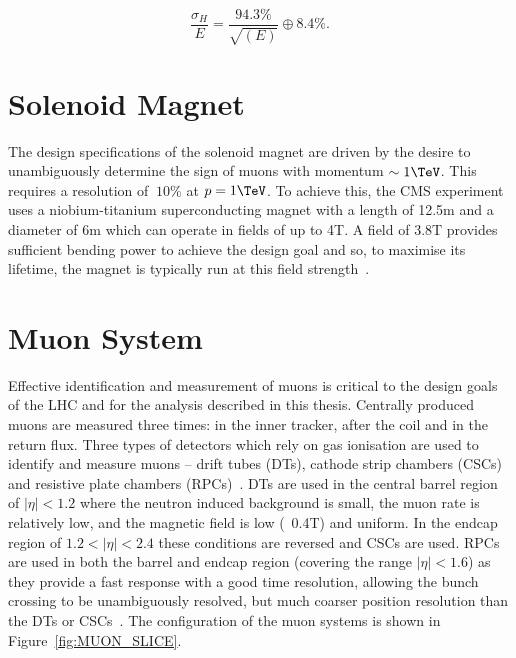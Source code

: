 \begin{equation}
\frac{\sigma_H}{E} = \frac{94.3\%}{\sqrt{(E)}} \oplus 8.4\%.
\label{equ:energy-resolution-hcal}
\end{equation}

\section{Solenoid Magnet}

The design specifications of the solenoid magnet are driven by the desire to unambiguously determine
the sign of muons with momentum $\sim 1\TeV$. This requires a resolution of $~10\%$ at $p=1\TeV$.
To achieve this, the CMS experiment uses a niobium-titanium superconducting magnet with a length of
12.5m and a diameter of 6m which can operate in fields of up to 4T. A field of 3.8T provides
sufficient bending power to achieve the design goal and so, to maximise its lifetime, the magnet is
typically run at this field strength~\cite{CMS}.

\section{Muon System}

Effective identification and measurement of muons is critical to the design goals of the LHC and
for the analysis described in this thesis. Centrally produced muons are measured three times:
in the inner tracker, after the coil and in the return flux. Three types of detectors which rely on gas ionisation are 
used to identify and measure muons -- drift tubes (DTs), cathode strip chambers (CSCs) and resistive
plate chambers (RPCs)~\cite{CMS}. DTs are used in the central barrel region of $|\eta| < 1.2$ where 
the neutron induced background is small, the muon rate is relatively low, 
and the magnetic field is low (~0.4T) and uniform. In the endcap region of $ 1.2 < |\eta| < 2.4$ these conditions are 
reversed and CSCs are used. RPCs are used in both the barrel and endcap region (covering the range $|\eta| < 1.6$) as they provide a fast response with a good time 
resolution, allowing the bunch crossing to be unambiguously resolved, but much coarser position resolution than the DTs or CSCs~\cite{muon_tdr}. 
The configuration of the muon systems is shown in Figure~\ref{fig:MUON_SLICE}.

